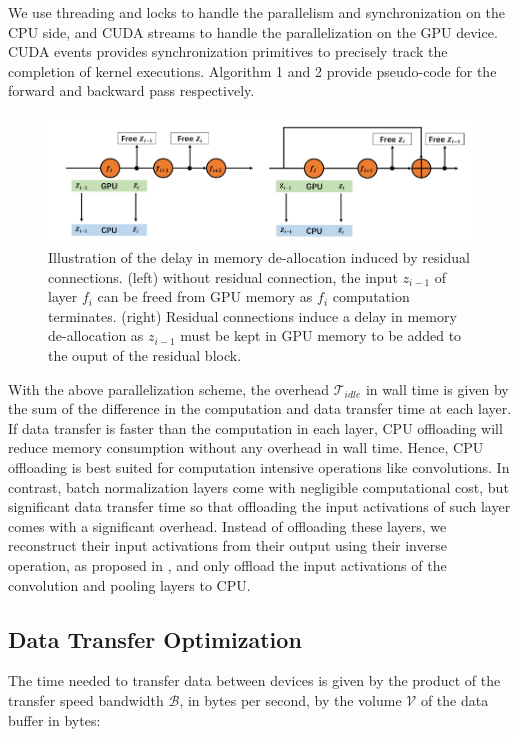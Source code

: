 \documentclass[11pt,onecolumn]{article}
\begin{document}
We use threading and locks to handle the parallelism and synchronization on the CPU side,
and CUDA streams to handle the parallelization on the GPU device. 
CUDA events provides synchronization primitives to precisely track 
the completion of kernel executions.
Algorithm 1 and 2 provide pseudo-code for the forward and backward pass respectively.

\begin{figure}[h]
\includegraphics[width=\textwidth]{Figure3.png}
\caption{Illustration of the delay in memory de-allocation induced by residual connections.
(left) without residual connection, the input $z_{i-1}$ of layer $f_i$ can be freed from GPU memory 
as $f_i$ computation terminates. 
(right) Residual connections induce a delay in memory de-allocation
as $z_{i-1}$ must be kept in GPU memory to be added to the ouput of the residual block. 
}
\end{figure}

With the above parallelization scheme, the overhead $\mathcal{T}_{idle}$ in wall time 
is given by the sum of the difference in the computation and data transfer time at each layer.
If data transfer is faster than the computation in each layer, 
CPU offloading will reduce memory consumption without any overhead in wall time.
Hence, CPU offloading is best suited for computation intensive operations like convolutions.
In contrast, batch normalization layers come with negligible computational cost,
but significant data transfer time so that offloading the input activations of 
such layer comes with a significant overhead.
Instead of offloading these layers, we reconstruct their input activations 
from their output using their inverse operation, as proposed in \cite{rota2018place},
and only offload the input activations of the convolution and pooling layers to CPU. 

 \subsection{Data Transfer Optimization}
The time needed to transfer data between devices is given by the product of the
transfer speed bandwidth $\mathcal{B}$, in bytes per second, by the volume 
$\mathcal{V}$ of the data buffer in bytes:
\end{document}
